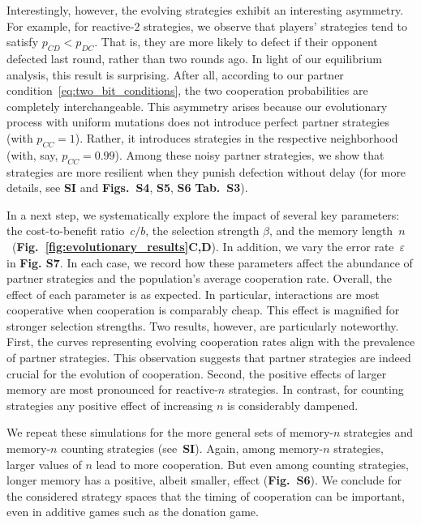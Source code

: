 \documentclass[9pt,twocolumn,twoside]{pnas-new}
\newcommand{\figref}[1]{{\textbf{Fig.~\ref{#1}}}}
\def\SI{\textbf{SI}}
\begin{document}
Interestingly, however, the evolving strategies exhibit an interesting asymmetry. 
For example, for reactive-2 strategies, we observe that players' strategies tend to satisfy $p_{CD}\!<\!p_{DC}$. 
That is, they are more likely to defect if their opponent defected last round, rather than two rounds ago. 
In light of our equilibrium analysis, this result is surprising. 
After all, according to our partner condition~\eqref{eq:two_bit_conditions}, the two cooperation probabilities are completely interchangeable. 
This asymmetry arises because our evolutionary process with uniform mutations does not introduce perfect partner strategies (with $p_{CC}\!=\!1$). 
Rather, it introduces strategies in the respective neighborhood (with, say, $p_{CC}\!=\!0.99$).
Among these noisy partner strategies, we show that strategies are more resilient when they punish defection without delay (for more details, see \SI{} and \textbf{Figs.~S4}, \textbf{S5}, \textbf{S6} \textbf{Tab.~S3}). 
 

In a next step, we systematically explore the impact of several key parameters: the cost-to-benefit ratio~$c/b$, the selection strength $\beta$, and the memory length~$n$~(\figref{fig:evolutionary_results}\textbf{C,D}). 
In addition, we vary the error rate~$\varepsilon$ in \textbf{Fig. S7}. 
In each case, we record how these parameters affect the abundance of partner strategies and the population's average cooperation rate. 
Overall, the effect of each parameter is as expected.  
In particular, interactions are most cooperative when cooperation is comparably cheap. 
This effect is magnified for stronger selection strengths. 
Two results, however, are particularly noteworthy. 
First, the curves representing evolving cooperation rates align with the prevalence of partner strategies. 
This observation suggests that partner strategies are indeed crucial for the evolution of cooperation. 
Second, the positive effects of larger memory are most pronounced for reactive-$n$ strategies. 
In contrast, for counting strategies any positive effect of increasing $n$ is considerably dampened. 

We repeat these simulations for the more general sets of memory-$n$ strategies and memory-$n$ counting strategies (see~\SI). 
Again, among memory-$n$ strategies, larger values of $n$ lead to more cooperation. 
But even among counting strategies, longer memory has a positive, albeit smaller, effect (\textbf{Fig.~S6}). 
We conclude for the considered strategy spaces that the timing of cooperation can be important, even in additive games such as the donation game. 
\end{document}

